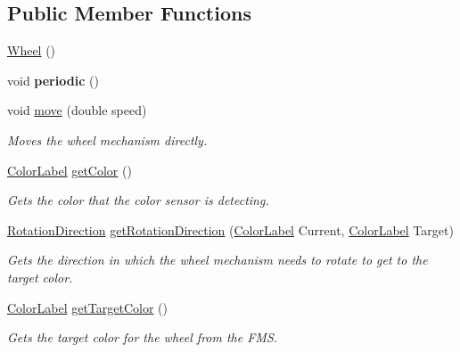 \subsection*{Public Member Functions}
\begin{DoxyCompactItemize}
\item 
\mbox{\hyperlink{classfrc_1_1robot_1_1subsystems_1_1_wheel_aadbb9a7450a3784b988393b5a74f55f2}{Wheel}} ()
\item 
\mbox{\label{classfrc_1_1robot_1_1subsystems_1_1_wheel_ac288181794bb15eccab8478e8de64629}} 
void {\bfseries periodic} ()
\item 
void \mbox{\hyperlink{classfrc_1_1robot_1_1subsystems_1_1_wheel_afcc64ab79a1f9902f6270d699d01a4ef}{move}} (double speed)
\begin{DoxyCompactList}\small\item\em Moves the wheel mechanism directly. \end{DoxyCompactList}\item 
\mbox{\hyperlink{enumfrc_1_1robot_1_1enums_1_1_color_label}{Color\+Label}} \mbox{\hyperlink{classfrc_1_1robot_1_1subsystems_1_1_wheel_aadef4c1c2a73fc8b4e656cb96987ebe7}{get\+Color}} ()
\begin{DoxyCompactList}\small\item\em Gets the color that the color sensor is detecting. \end{DoxyCompactList}\item 
\mbox{\hyperlink{enumfrc_1_1robot_1_1enums_1_1_rotation_direction}{Rotation\+Direction}} \mbox{\hyperlink{classfrc_1_1robot_1_1subsystems_1_1_wheel_a6a27eea19185863babdb6edacf07024b}{get\+Rotation\+Direction}} (\mbox{\hyperlink{enumfrc_1_1robot_1_1enums_1_1_color_label}{Color\+Label}} Current, \mbox{\hyperlink{enumfrc_1_1robot_1_1enums_1_1_color_label}{Color\+Label}} Target)
\begin{DoxyCompactList}\small\item\em Gets the direction in which the wheel mechanism needs to rotate to get to the target color. \end{DoxyCompactList}\item 
\mbox{\hyperlink{enumfrc_1_1robot_1_1enums_1_1_color_label}{Color\+Label}} \mbox{\hyperlink{classfrc_1_1robot_1_1subsystems_1_1_wheel_a0b2f59c04fb658942ff3c7d60a66d4d2}{get\+Target\+Color}} ()
\begin{DoxyCompactList}\small\item\em Gets the target color for the wheel from the F\+MS. \end{DoxyCompactList}\end{DoxyCompactItemize}
